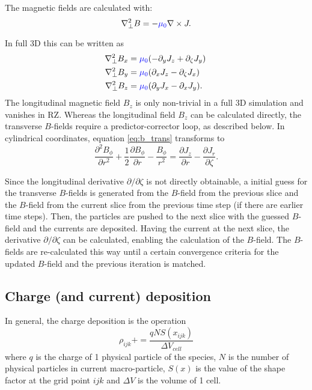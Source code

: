 \documentclass{article}
\begin{document}
The magnetic fields are calculated with:
\begin{equation} \label{eq:b_trans}
\nabla_{\perp}^2 B = - \textcolor{blue}{\mu_0} \nabla \times J .
\end{equation}

In full 3D this can be written as
\begin{subequations}
\begin{align}
\nabla_{\perp}^2 B_x  &= \textcolor{blue}{\mu_0}(- \partial_y J_z + \partial_{\zeta} J_y) \,  \\
\nabla_{\perp}^2  B_y  &=   \textcolor{blue}{\mu_0}(\partial_x J_z - \partial_{\zeta} J_x)   \, \\
 \nabla^2_{\perp} B_z &= \textcolor{blue}{\mu_0}(\partial_y J_x - \partial_x J_y).
\end{align}
\end{subequations}
The longitudinal magnetic field $B_z$ is only non-trivial in a full 3D simulation and vanishes in RZ. Whereas the longitudinal field $B_z$ can be calculated directly, the transverse $B$-fields require a predictor-corrector loop, as described below.
In cylindrical coordinates, equation \ref{eq:b_trans} transforms to
\begin{equation}
\frac{\partial^2 B_{\phi}}{\partial r^2} + \frac{1}{2} \frac{\partial B_{\phi}}{\partial r} - \frac{B_{\phi}}{r^2} = \frac{\partial J_z}{\partial r} - \frac{\partial J_r}{\partial \zeta}.
\end{equation}

Since the longitudinal derivative $\partial / \partial \zeta$ is not directly obtainable, a initial guess for the transverse $B$-fields is generated from the $B$-field from the previous slice and the $B$-field from the current slice from the previous time step (if there are earlier time steps). Then, the particles are pushed to the next slice with the guessed $B$-field and the currents are deposited. Having the current at the next slice, the derivative $\partial / \partial \zeta$ can be calculated, enabling the calculation of the $B$-field. The $B$-fields are re-calculated this way until a certain convergence criteria for the updated $B$-field and the previous iteration is matched.

\subsection*{Charge (and current) deposition}

In general, the charge deposition is the operation
\begin{equation}
\rho_{ijk} += \frac{q N S(x_{ijk})}{\Delta V_{cell}}
\end{equation}
where $q$ is the charge of 1 physical particle of the species, $N$ is the number of physical particles in current macro-particle, $S(x)$ is the value of the shape factor at the grid point $ijk$ and $\Delta V$ is the volume of 1 cell.
\end{document}
